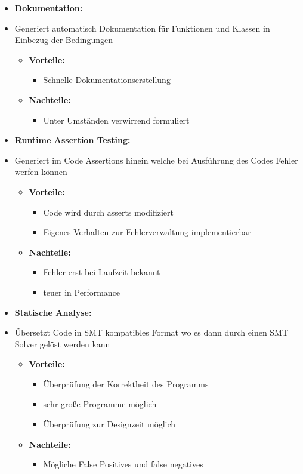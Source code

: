 \documentclass[a4paper,12pt]{article}
\begin{document}
\begin{itemize}
    \item \textbf{Dokumentation:}
    \item Generiert automatisch Dokumentation für Funktionen und Klassen in Einbezug der Bedingungen
    \begin{itemize}
        \item \textbf{Vorteile:}
        \begin{itemize}
            \item Schnelle Dokumentationserstellung
        \end{itemize}
        \item \textbf{Nachteile:}
        \begin{itemize}
            \item Unter Umständen verwirrend formuliert
        \end{itemize}
    \end{itemize}
    \item \textbf{Runtime Assertion Testing:}
    \item Generiert im Code Assertions hinein welche bei Ausführung des Codes Fehler werfen können
    \begin{itemize}
        \item \textbf{Vorteile:}
        \begin{itemize}
            \item Code wird durch asserts modifiziert
            \item Eigenes Verhalten zur Fehlerverwaltung implementierbar
        \end{itemize}
        \item \textbf{Nachteile:}
        \begin{itemize}
            \item Fehler erst bei Laufzeit bekannt
            \item teuer in Performance
        \end{itemize}
    \end{itemize}
    \item \textbf{Statische Analyse:}
    \item Übersetzt Code in SMT kompatibles Format wo es dann durch einen SMT Solver gelöst werden kann
    \begin{itemize}
        \item \textbf{Vorteile:}
        \begin{itemize}
            \item Überprüfung der Korrektheit des Programms
            \item sehr große Programme möglich
            \item Überprüfung zur Designzeit möglich
        \end{itemize}
        \item \textbf{Nachteile:}
        \begin{itemize}
            \item Mögliche False Positives und false negatives
        \end{itemize}
    \end{itemize}
\end{itemize}
\end{document}

